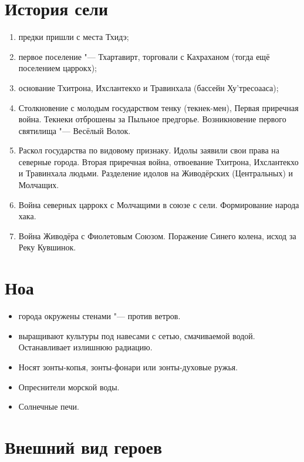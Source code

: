 \section{История сели}

\begin{enumerate}
\item предки пришли с места Тхидэ;
\item первое поселение "--- Тхартавирт, торговали с Кахраханом (тогда ещё поселением царрокх);
\item основание Тхитрона, Ихслантекхо и Травинхала (бассейн Ху'тресоааса);
\item Столкновение с молодым государством тенку (текнек-мен), Первая приречная война.
Текнеки отброшены за Пыльное предгорье.
Возникновение первого святилища "--- Весёлый Волок.
\item Раскол государства по видовому признаку.
Идолы заявили свои права на северные города.
Вторая приречная война, отвоевание Тхитрона, Ихслантекхо и Травинхала людьми.
Разделение идолов на Живодёрских (Центральных) и Молчащих.
\item Война северных царрокх с Молчащими в союзе с сели.
Формирование народа хака.
\item Война Живодёра с Фиолетовым Союзом.
Поражение Синего колена, исход за Реку Кувшинок.
\end{enumerate}

\section{Ноа}

\begin{itemize}
\item города окружены стенами "--- против ветров.
\item выращивают культуры под навесами с сетью, смачиваемой водой.
Останавливает излишнюю радиацию.
\item Носят зонты-копья, зонты-фонари или зонты-духовые ружья.
\item Опреснители морской воды.
\item Солнечные печи.
\end{itemize}

\section{Внешний вид героев}

